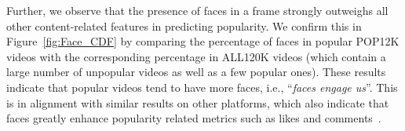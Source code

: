 Further, we observe that the presence of faces in a frame strongly outweighs all other content-related features in predicting popularity. %
We confirm this in Figure~\ref{fig:Face_CDF} by comparing the percentage of faces in popular POP12K videos with the corresponding percentage in ALL120K videos (which contain a large number of unpopular videos as well as a few popular ones).  These results indicate that popular videos tend to have more faces, i.e., ``\emph{faces engage us}''. This is in alignment with similar results on other platforms, which also indicate that faces greatly enhance popularity related metrics such as likes and comments~\cite{bakhshi2014faces}. 


\begin{figure}[htp]
    \centering
    
    

\end{figure}
